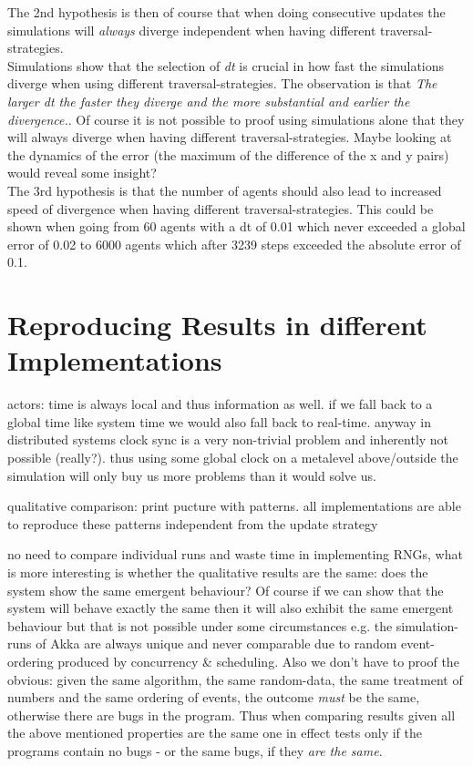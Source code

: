 The 2nd hypothesis is then of course that when doing consecutive updates the simulations will \textit{always} diverge independent when having different traversal-strategies. \\
Simulations show that the selection of \textit{dt} is crucial in how fast the simulations diverge when using different traversal-strategies. The observation is that \textit{The larger dt the faster they diverge and the more substantial and earlier the divergence.}. Of course it is not possible to proof using simulations alone that they will always diverge when having different traversal-strategies. Maybe looking at the dynamics of the error (the maximum of the difference of the x and y pairs) would reveal some insight? \\

The 3rd hypothesis is that the number of agents should also lead to increased speed of divergence when having different traversal-strategies. This could be shown when going from 60 agents with a dt of 0.01 which never exceeded a global error of 0.02 to 6000 agents which after 3239 steps exceeded the absolute error of 0.1.

\section{Reproducing Results in different Implementations}
actors: time is always local and thus information as well. if we fall back to a global time like system time we would also fall back to real-time. anyway in distributed systems clock sync is a very non-trivial problem and inherently not possible (really?). thus using some global clock on a metalevel above/outside the simulation will only buy us more problems than it would solve us. 

qualitative comparison: print pucture with patterns. all implementations are able to reproduce these patterns independent from the update strategy

no need to compare individual runs and waste time in implementing RNGs, what is more interesting is whether the qualitative results are the same: does the system show the same emergent behaviour? Of course if we can show that the system will behave exactly the same then it will also exhibit the same emergent behaviour but that is not possible under some circumstances e.g. the simulation-runs of Akka are always unique and never comparable due to random event-ordering produced by concurrency \& scheduling. Also we don't have to proof the obvious: given the same algorithm, the same random-data, the same treatment of numbers and the same ordering of events, the outcome \textit{must} be the same, otherwise there are bugs in the program. Thus when comparing results given all the above mentioned properties are the same one in effect tests only if the programs contain no bugs - or the same bugs, if they \textit{are the same}. \\

